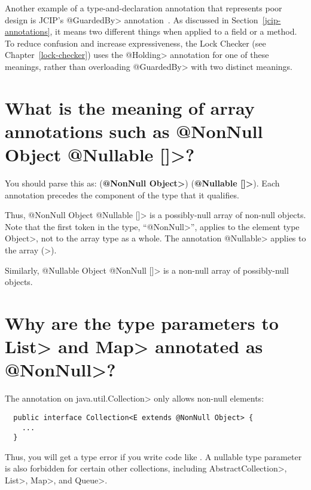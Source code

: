 Another example of a type-and-declaration annotation that represents poor
design is JCIP's \<@GuardedBy> annotation~\cite{Goetz2006}.  As discussed
in Section~\ref{jcip-annotations}, it means two different things when
applied to a field or a method.  To reduce confusion and increase
expressiveness, the Lock Checker (see Chapter~\ref{lock-checker}) uses the
\<@Holding> annotation for one of these meanings, rather than overloading
\<@GuardedBy> with two distinct meanings.



\section{What is the meaning of array annotations such as \<@NonNull Object @Nullable []>?\label{faq-array-syntax-meaning}}

You should parse this as:
(\textbf{\<@NonNull Object>}) (\textbf{\<@Nullable []>}).
Each annotation precedes the component of the type that it qualifies.

Thus,
\<@NonNull Object @Nullable []> is a possibly-null array of non-null
objects.  Note that the first token in the type,
``\<@NonNull>'', applies to the element
type \<Object>, not to the array type as a whole.  The annotation \<@Nullable> applies to the
array (\<[]>).

Similarly,
\<@Nullable Object @NonNull []> is a non-null array of possibly-null
objects.


\section{Why are the type parameters to \<List> and \<Map> annotated as \<@NonNull>?\label{faq-list-map-nonnull-typeargs}}

The annotation on \<java.util.Collection> only allows non-null elements:

\begin{Verbatim}
  public interface Collection<E extends @NonNull Object> {
    ...
  }
\end{Verbatim}

\noindent
Thus, you will get a type error if you write code like
.
A nullable
type parameter is also forbidden for certain other collections, including
\<AbstractCollection>, \<List>, \<Map>, and \<Queue>.


